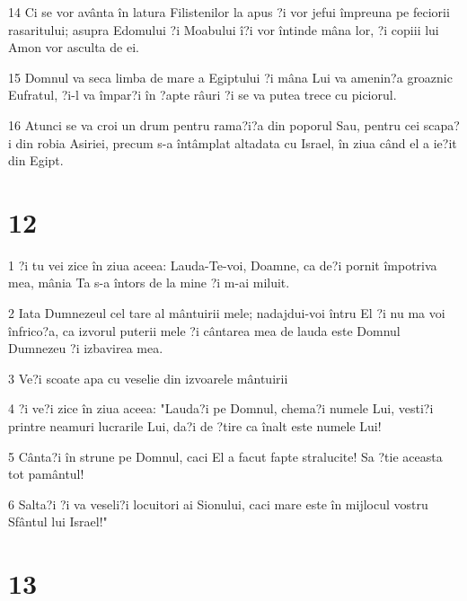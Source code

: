 \par 14 Ci se vor avânta în latura Filistenilor la apus ?i vor jefui împreuna pe feciorii rasaritului; asupra Edomului ?i Moabului î?i vor întinde mâna lor, ?i copiii lui Amon vor asculta de ei.
\par 15 Domnul va seca limba de mare a Egiptului ?i mâna Lui va amenin?a groaznic Eufratul, ?i-l va împar?i în ?apte râuri ?i se va putea trece cu piciorul.
\par 16 Atunci se va croi un drum pentru rama?i?a din poporul Sau, pentru cei scapa?i din robia Asiriei, precum s-a întâmplat altadata cu Israel, în ziua când el a ie?it din Egipt.

\chapter{12}

\par 1 ?i tu vei zice în ziua aceea: Lauda-Te-voi, Doamne, ca de?i pornit împotriva mea, mânia Ta s-a întors de la mine ?i m-ai miluit.
\par 2 Iata Dumnezeul cel tare al mântuirii mele; nadajdui-voi întru El ?i nu ma voi înfrico?a, ca izvorul puterii mele ?i cântarea mea de lauda este Domnul Dumnezeu ?i izbavirea mea.
\par 3 Ve?i scoate apa cu veselie din izvoarele mântuirii
\par 4 ?i ve?i zice în ziua aceea: "Lauda?i pe Domnul, chema?i numele Lui, vesti?i printre neamuri lucrarile Lui, da?i de ?tire ca înalt este numele Lui!
\par 5 Cânta?i în strune pe Domnul, caci El a facut fapte stralucite! Sa ?tie aceasta tot pamântul!
\par 6 Salta?i ?i va veseli?i locuitori ai Sionului, caci mare este în mijlocul vostru Sfântul lui Israel!"

\chapter{13}

